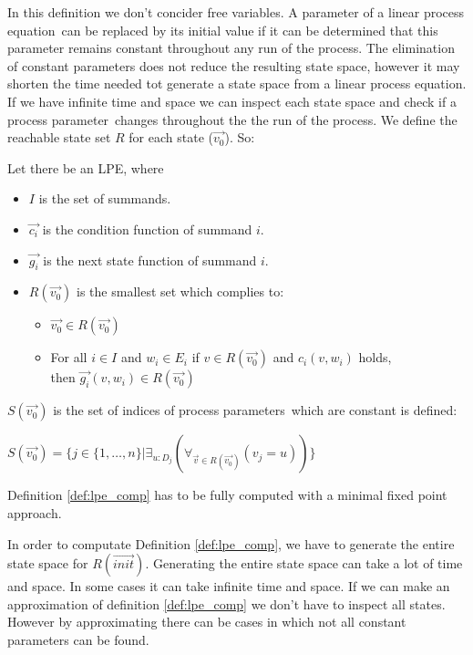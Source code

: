 \documentclass[a4paper,10pt]{article}
\newcommand{\lpe}{linear process equation}
\newcommand{\ovr}{\overrightarrow}
\newcommand{\pp}{process parameter}
\newcommand{\pps}{process parameters}
\begin{document}
In this definition we don't concider free variables.
A parameter of a \lpe\ can be replaced by its initial value if it can be determined that this parameter remains constant throughout any run of the process. The elimination of constant parameters does not reduce the resulting state space, however it may shorten the time needed tot generate a state space from a \lpe. \\
If we have infinite time and space we can inspect each state space and check if a \pp\ changes throughout the the run of the process. We define the reachable state set $R$ for each state ($\ovr{v_0}$). So:
\begin{defn}\label{def:lpe} Let there be an LPE, where\begin{itemize}
\item $I$ is the set of summands.
\item $\ovr{c_i}$ is the condition function of summand $i$.
\item $\ovr{g_i}$ is the next state function of summand $i$.
\item
$R(\ovr{v_0})$ is the smallest set which complies to:
  \begin{itemize}
    \item $\ovr{v_0} \in R(\ovr{v_0})$
    \item For all $i \in I$ and $w_i \in E_i$ if $v \in R(\ovr{v_0})$ and $c_i(v, w_i)$ holds, \\ then $\ovr{g_i}(v, w_i) \in R(\ovr{v_0})$ \\
   \end{itemize}
\end{itemize}

\end{defn}

$S(\ovr{v_0})$ is the set of indices of \pps\ which are constant is defined:

\begin{defn}\label{def:lpe_comp}
$S(\ovr{v_0}) = \lbrace j \in  \lbrace 1, \ldots, n \rbrace \vert \exists_{u : D_j} (\forall_{\ovr{v} \in R(\ovr{v_0})}( v_j = u)) \rbrace $
\end{defn}

 Definition \ref{def:lpe_comp} has to be fully computed  with a minimal fixed point approach. 

In order to computate  Definition \ref{def:lpe_comp}, we have to generate the entire state space for $R(\ovr{init})$. Generating the entire state space can take a lot of time and space. In some cases it can take infinite time and space. If we can make an approximation of definition \ref{def:lpe_comp} we don't have to inspect all states. However by approximating there can be cases in which not all constant parameters can be found. 
\end{document}
